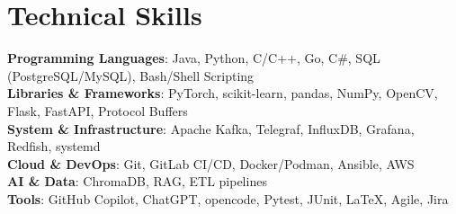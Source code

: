 \section{Technical Skills}
\begin{itemize}[leftmargin=0.15in, label={}]
	\small{\item{
		      \textbf{Programming Languages}{: Java, Python, C/C++, Go, C\#, SQL (PostgreSQL/MySQL), Bash/Shell Scripting}
		      \\
		      \textbf{Libraries \& Frameworks}{: PyTorch, scikit-learn, pandas, NumPy, OpenCV, Flask, FastAPI, Protocol Buffers}
		      \\
		      \textbf{System \& Infrastructure}{: Apache Kafka, Telegraf, InfluxDB, Grafana, Redfish, systemd}
		      \\
		      \textbf{Cloud \& DevOps}{: Git, GitLab CI/CD, Docker/Podman, Ansible, AWS}
		      \\
		      \textbf{AI \& Data}{: ChromaDB, RAG, ETL pipelines}
		      \\
		      \textbf{Tools}{: GitHub Copilot, ChatGPT, opencode, Pytest, JUnit, LaTeX, Agile, Jira}
	      }}
\end{itemize}\vspace{-14.2pt} %
